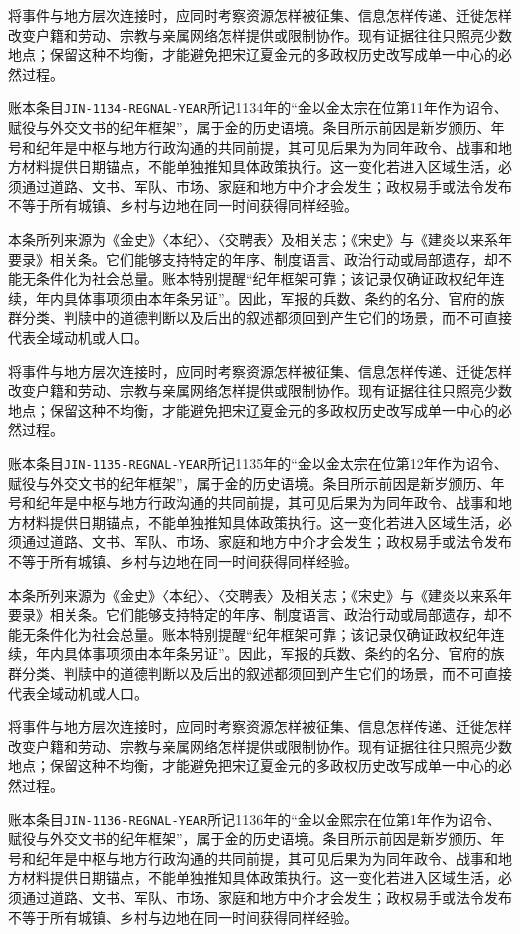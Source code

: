 将事件与地方层次连接时，应同时考察资源怎样被征集、信息怎样传递、迁徙怎样改变户籍和劳动、宗教与亲属网络怎样提供或限制协作。现有证据往往只照亮少数地点；保留这种不均衡，才能避免把宋辽夏金元的多政权历史改写成单一中心的必然过程。

账本条目\texttt{JIN-1134-REGNAL-YEAR}所记1134年的“金以金太宗在位第11年作为诏令、赋役与外交文书的纪年框架”，属于金的历史语境。条目所示前因是新岁颁历、年号和纪年是中枢与地方行政沟通的共同前提，其可见后果为为同年政令、战事和地方材料提供日期锚点，不能单独推知具体政策执行。这一变化若进入区域生活，必须通过道路、文书、军队、市场、家庭和地方中介才会发生；政权易手或法令发布不等于所有城镇、乡村与边地在同一时间获得同样经验。

本条所列来源为《金史》〈本纪〉、〈交聘表〉及相关志；《宋史》与《建炎以来系年要录》相关条。它们能够支持特定的年序、制度语言、政治行动或局部遗存，却不能无条件化为社会总量。账本特别提醒“纪年框架可靠；该记录仅确证政权纪年连续，年内具体事项须由本年条另证”。因此，军报的兵数、条约的名分、官府的族群分类、判牍中的道德判断以及后出的叙述都须回到产生它们的场景，而不可直接代表全域动机或人口。

将事件与地方层次连接时，应同时考察资源怎样被征集、信息怎样传递、迁徙怎样改变户籍和劳动、宗教与亲属网络怎样提供或限制协作。现有证据往往只照亮少数地点；保留这种不均衡，才能避免把宋辽夏金元的多政权历史改写成单一中心的必然过程。

账本条目\texttt{JIN-1135-REGNAL-YEAR}所记1135年的“金以金太宗在位第12年作为诏令、赋役与外交文书的纪年框架”，属于金的历史语境。条目所示前因是新岁颁历、年号和纪年是中枢与地方行政沟通的共同前提，其可见后果为为同年政令、战事和地方材料提供日期锚点，不能单独推知具体政策执行。这一变化若进入区域生活，必须通过道路、文书、军队、市场、家庭和地方中介才会发生；政权易手或法令发布不等于所有城镇、乡村与边地在同一时间获得同样经验。

本条所列来源为《金史》〈本纪〉、〈交聘表〉及相关志；《宋史》与《建炎以来系年要录》相关条。它们能够支持特定的年序、制度语言、政治行动或局部遗存，却不能无条件化为社会总量。账本特别提醒“纪年框架可靠；该记录仅确证政权纪年连续，年内具体事项须由本年条另证”。因此，军报的兵数、条约的名分、官府的族群分类、判牍中的道德判断以及后出的叙述都须回到产生它们的场景，而不可直接代表全域动机或人口。

将事件与地方层次连接时，应同时考察资源怎样被征集、信息怎样传递、迁徙怎样改变户籍和劳动、宗教与亲属网络怎样提供或限制协作。现有证据往往只照亮少数地点；保留这种不均衡，才能避免把宋辽夏金元的多政权历史改写成单一中心的必然过程。

账本条目\texttt{JIN-1136-REGNAL-YEAR}所记1136年的“金以金熙宗在位第1年作为诏令、赋役与外交文书的纪年框架”，属于金的历史语境。条目所示前因是新岁颁历、年号和纪年是中枢与地方行政沟通的共同前提，其可见后果为为同年政令、战事和地方材料提供日期锚点，不能单独推知具体政策执行。这一变化若进入区域生活，必须通过道路、文书、军队、市场、家庭和地方中介才会发生；政权易手或法令发布不等于所有城镇、乡村与边地在同一时间获得同样经验。

